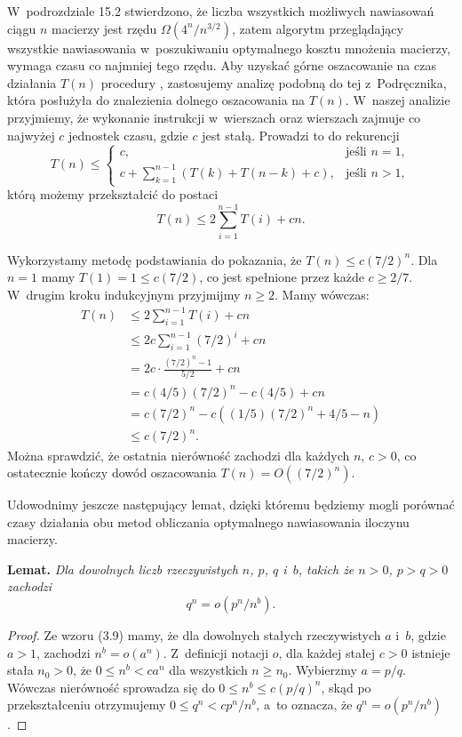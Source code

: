 
\exercise %
W~podrozdziale 15.2 stwierdzono, że liczba wszystkich możliwych nawiasowań ciągu $n$ macierzy jest rzędu $\Omega(4^n\!/n^{3/2})$, zatem algorytm przeglądający wszystkie nawiasowania w~poszukiwaniu optymalnego kosztu mnożenia macierzy, wymaga czasu co najmniej tego rzędu.
Aby uzyskać górne oszacowanie na czas działania $T(n)$ procedury , zastosujemy analizę podobną do tej z~Podręcznika, która posłużyła do znalezienia dolnego oszacowania na $T(n)$.
W~naszej analizie przyjmiemy, że wykonanie instrukcji w~wierszach  oraz wierszach  zajmuje co najwyżej $c$ jednostek czasu, gdzie $c$ jest stałą.
Prowadzi to do rekurencji
\[
	T(n) \le \begin{cases}
		c, & \text{jeśli $n=1$}, \\
		c+\displaystyle\sum_{k=1}^{n-1}(T(k)+T(n-k)+c), & \text{jeśli $n>1$},
	\end{cases}
\]
którą możemy przekształcić do postaci
\[
	T(n) \le 2\sum_{i=1}^{n-1}T(i)+cn.
\]

Wykorzystamy metodę podstawiania do pokazania, że $T(n)\le c(7/2)^n$.
Dla $n=1$ mamy $T(1)=1\le c(7/2)$, co jest spełnione przez każde $c\ge2/7$.
W~drugim kroku indukcyjnym przyjmijmy $n\ge2$.
Mamy wówczas:
\begin{align*}
	T(n) &\le 2\sum_{i=1}^{n-1}T(i)+cn \\
	&\le 2c\sum_{i=1}^{n-1}(7/2)^i+cn \\
	&= 2c\cdot\frac{(7/2)^n-1}{5/2}+cn \\
	&= c(4/5)(7/2)^n-c(4/5)+cn \\
	&= c(7/2)^n-c((1/5)(7/2)^n+4/5-n) \\
	&\le c(7/2)^n.
\end{align*}
Można sprawdzić, że ostatnia nierówność zachodzi dla każdych $n$, $c>0$, co ostatecznie kończy dowód oszacowania $T(n)=O((7/2)^n)$.

Udowodnimy jeszcze następujący lemat, dzięki któremu będziemy mogli porównać czasy działania obu metod obliczania optymalnego nawiasowania iloczynu macierzy.

\medskip
\noindent\textsf{\textbf{Lemat.}} \textit{Dla dowolnych liczb rzeczywistych\/ $n$, $p$, $q$ i\/~$b$, takich że\/ $n>0$,\/ $p>q>0$ zachodzi}
\[
	q^n = o(p^n\!/n^b).
\]
\begin{proof}
Ze wzoru (3.9) mamy, że dla dowolnych stałych rzeczywistych $a$ i~$b$, gdzie $a>1$, zachodzi $n^b=o(a^n)$.
Z~definicji notacji $o$, dla każdej stałej $c>0$ istnieje stała $n_0>0$, że $0\le n^b<ca^n$ dla wszystkich $n\ge n_0$.
Wybierzmy $a=p/q$.
Wówczas nierówność sprowadza się do $0\le n^b\le c(p/q)^n$, skąd po przekształceniu otrzymujemy $0\le q^n<cp^n\!/n^b$, a~to oznacza, że $q^n=o(p^n\!/n^b)$.
\end{proof}

